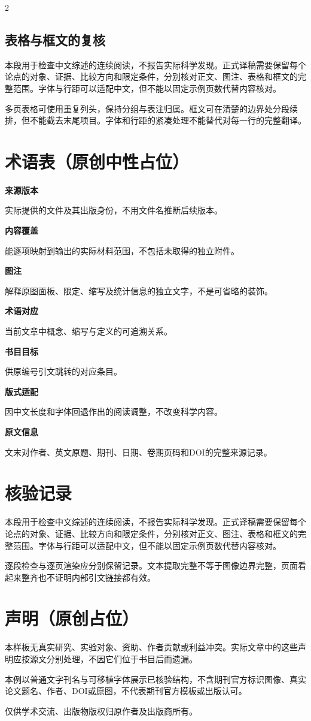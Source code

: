 \documentclass[UTF8,fontset=none,scheme=plain]{ctexart}
\renewcommand{\normalsize}{\fontsize{9.05bp}{12.1bp}\selectfont}
\newenvironment{NRColumns}{\begin{multicols}{2}\normalsize}{\end{multicols}}
\newcommand{\NeutralParagraph}{本段用于检查中文综述的连续阅读，不报告实际科学发现。正式译稿需要保留每个论点的对象、证据、比较方向和限定条件，分别核对正文、图注、表格和框文的完整范围。字体与行距可以适配中文，但不能以固定示例页数代替内容核对。\par}
\begin{document}
\begin{NRColumns}\subsection*{表格与框文的复核}
\NeutralParagraph
多页表格可使用重复列头，保持分组与表注归属。框文可在清楚的边界处分段续排，但不能截去末尾项目。字体和行距的紧凑处理不能替代对每一行的完整翻译。
\end{NRColumns}
\clearpage
\noindent\begin{minipage}[t]{254.7bp}\vspace{0pt}
\section*{术语表（原创中性占位）}
{\sffamily\fontsize{8.1bp}{10.7bp}\selectfont
\textbf{来源版本}\par 实际提供的文件及其出版身份，不用文件名推断后续版本。\par\smallskip
\textbf{内容覆盖}\par 能逐项映射到输出的实际材料范围，不包括未取得的独立附件。\par\smallskip
\textbf{图注}\par 解释原图面板、限定、缩写及统计信息的独立文字，不是可省略的装饰。\par\smallskip
\textbf{术语对应}\par 当前文章中概念、缩写与定义的可追溯关系。\par\smallskip
\textbf{书目目标}\par 供原编号引文跳转的对应条目。\par\smallskip
\textbf{版式适配}\par 因中文长度和字体回退作出的阅读调整，不改变科学内容。\par\smallskip
\textbf{原文信息}\par 文末对作者、英文原题、期刊、日期、卷期页码和DOI的完整来源记录。\par}
\section*{核验记录}
\NeutralParagraph
逐段检查与逐页渲染应分别保留记录。文本提取完整不等于图像边界完整，页面看起来整齐也不证明内部引文链接都有效。\par
\end{minipage}\hfill\begin{minipage}[t]{254.7bp}\vspace{0pt}
\section*{声明（原创占位）}
本样板无真实研究、实验对象、资助、作者贡献或利益冲突。实际文章中的这些声明应按源文分别处理，不因它们位于书目后而遗漏。\par
本例以普通文字刊名与可移植字体展示已核验结构，不含期刊官方标识图像、真实论文题名、作者、DOI或原图，不代表期刊官方模板或出版认可。\par
\SampleBibliography
\SampleSourceInfo
仅供学术交流、出版物版权归原作者及出版商所有。\par
\end{minipage}
\end{document}
